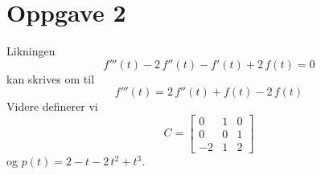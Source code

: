 \documentclass{article}[norsk]
\begin{document}
\section*{Oppgave 2}
Likningen
\begin{equation}\label{eq:opg2:1}
	f'''(t)-2\,f''(t)-f'(t)+2\,f(t)=0
\end{equation}
kan skrives om til 
\begin{equation}\label{eq:opg2:fddd}
	f'''(t)=2\,f''(t)+f(t)-2\,f(t)
\end{equation}
Videre definerer vi 
\begin{equation*}
	C=\begin{bmatrix}
    	0&1&0\\
        0&0&1\\
        -2&1&2
	\end{bmatrix}
\end{equation*}
og $p(t)=2-t-2\,t^2+t^3$.
\end{document}
